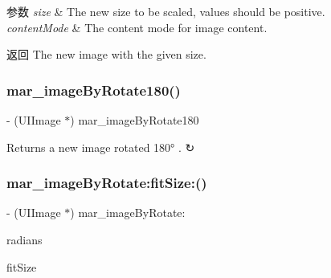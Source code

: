 \begin{DoxyParams}{参数}
{\em size} & The new size to be scaled, values should be positive.\\
\hline
{\em content\+Mode} & The content mode for image content.\\
\hline
\end{DoxyParams}
\begin{DoxyReturn}{返回}
The new image with the given size. 
\end{DoxyReturn}
\mbox{\label{category_u_i_image_07_m_a_r_e_x_08_af209792ff45da2713eee418e370f3df9}} 
\subsubsection{\texorpdfstring{mar\+\_\+image\+By\+Rotate180()}{mar\_imageByRotate180()}}
{\footnotesize\ttfamily -\/ (U\+I\+Image $\ast$) mar\+\_\+image\+By\+Rotate180 \begin{DoxyParamCaption}{ }\end{DoxyParamCaption}}

Returns a new image rotated 180° . ↻ \mbox{\label{category_u_i_image_07_m_a_r_e_x_08_a26ce4b42045cf225dceed3520912061c}} 
\subsubsection{\texorpdfstring{mar\+\_\+image\+By\+Rotate\+:fit\+Size\+:()}{mar\_imageByRotate:fitSize:()}}
{\footnotesize\ttfamily -\/ (U\+I\+Image $\ast$) mar\+\_\+image\+By\+Rotate\+: \begin{DoxyParamCaption}\item[{(C\+G\+Float)}]{radians }\item[{fitSize:(B\+O\+OL)}]{fit\+Size }\end{DoxyParamCaption}}

